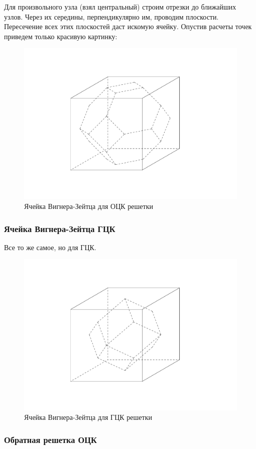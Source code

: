 \documentclass[a4paper, 12pt]{article}
\begin{document}
Для произвольного узла (взял центральный) строим отрезки до ближайших узлов. Через их середины, перпендикулярно им, проводим плоскости. Пересечение всех этих плоскостей даст искомую ячейку. Опустив расчеты точек приведем только красивую картинку:

\begin{figure}[H]
	\centering
	\includegraphics[width=0.8\linewidth]{1_OCK}
	\caption{Ячейка Вигнера-Зейтца для ОЦК решетки}
\end{figure}

\subsubsection{Ячейка Вигнера-Зейтца ГЦК}

Все то же самое, но для ГЦК.

\begin{figure}[H]
	\centering
	\includegraphics[width=0.8\linewidth]{1_GCK}
	\caption{Ячейка Вигнера-Зейтца для ГЦК решетки}
\end{figure}

\subsubsection{Обратная решетка ОЦК}
\end{document}
